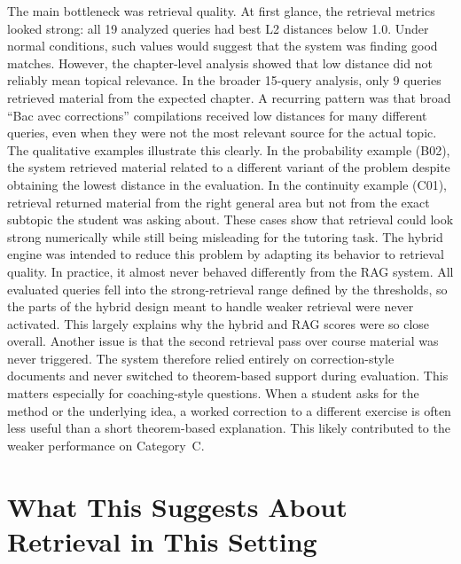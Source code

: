 The main bottleneck was retrieval quality. At first glance, the retrieval
metrics looked strong: all 19 analyzed queries had best L2 distances below
1.0. Under normal conditions, such values would suggest that the system was
finding good matches.
However, the chapter-level analysis showed that low distance did not
reliably mean topical relevance. In the broader 15-query analysis, only 9
queries retrieved material from the expected chapter. A recurring pattern
was that broad ``Bac avec corrections'' compilations received low distances
for many different queries, even when they were not the most relevant source
for the actual topic.
The qualitative examples illustrate this clearly. In the probability example
(B02), the system retrieved material related to a different variant of the
problem despite obtaining the lowest distance in the evaluation. In the
continuity example (C01), retrieval returned material from the right general
area but not from the exact subtopic the student was asking about. These
cases show that retrieval could look strong numerically while still being
misleading for the tutoring task.
The hybrid engine was intended to reduce this problem by adapting its
behavior to retrieval quality. In practice, it almost never behaved
differently from the RAG system. All evaluated queries fell into the
strong-retrieval range defined by the thresholds, so the parts of the hybrid
design meant to handle weaker retrieval were never activated. This largely
explains why the hybrid and RAG scores were so close overall.
Another issue is that the second retrieval pass over course material was
never triggered. The system therefore relied entirely on correction-style
documents and never switched to theorem-based support during evaluation.
This matters especially for coaching-style questions. When a student asks
for the method or the underlying idea, a worked correction to a different
exercise is often less useful than a short theorem-based explanation. This
likely contributed to the weaker performance on Category~C.

\section{What This Suggests About Retrieval in This Setting}
\label{sec:value-of-retrieval}

